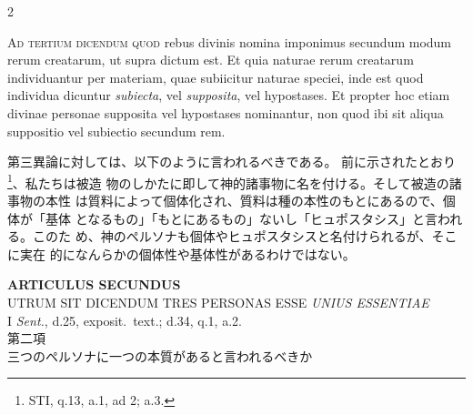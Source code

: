\documentclass[paper=a4paper,fontsize=10pt,jafontsize=9pt,titlepage]{jlreq}
\begin{document}
\begin{paracol}{2}
\switchcolumn*

{\scshape Ad tertium dicendum quod} rebus divinis nomina imponimus secundum modum
rerum creatarum, ut supra dictum est. Et quia naturae rerum creatarum
individuantur per materiam, quae subiicitur naturae speciei, inde est
quod individua dicuntur {\itshape subiecta}, vel {\itshape supposita}, vel hypostases. Et
propter hoc etiam divinae personae supposita vel hypostases nominantur,
non quod ibi sit aliqua suppositio vel subiectio secundum rem.

\switchcolumn

第三異論に対しては、以下のように言われるべきである。
前に示されたとおり\footnote{STI, q.13, a.1, ad 2; a.3.}、私たちは被造
 物のしかたに即して神的諸事物に名を付ける。そして被造の諸事物の本性
 は質料によって個体化され、質料は種の本性のもとにあるので、個体が「基体
となるもの」「もとにあるもの」ないし「ヒュポスタシス」と言われる。このた
 め、神のペルソナも個体やヒュポスタシスと名付けられるが、そこに実在
 的になんらかの個体性や基体性があるわけではない。

\switchcolumn*

\end{paracol}
\newpage






\begin{center}
 {\Large {\bfseries ARTICULUS SECUNDUS}}\\
 {\large UTRUM SIT DICENDUM TRES PERSONAS ESSE {\itshape UNIUS ESSENTIAE}}\\
 {\footnotesize I {\itshape Sent.}, d.25, exposit.~text.; d.34, q.1, a.2.}\\
 {\Large 第二項\\三つのペルソナに一つの本質があると言われるべきか}
\end{center}
\end{document}
